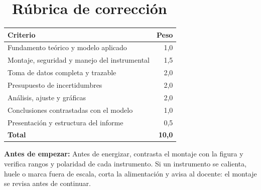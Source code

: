 \documentclass[11pt,a4paper]{article}
\newcommand{\iconotexto}[2]{\textcolor{cyanNeon}{\faIcon{#1}}~#2}
\begin{document}
\section{\iconotexto{ruler-combined}{Rúbrica de corrección}}

\begin{tabularx}{\linewidth}{@{}X r@{}}
\toprule
Criterio & Peso\\
\midrule
Fundamento teórico y modelo aplicado & 1,0 \\
Montaje, seguridad y manejo del instrumental & 1,5 \\
Toma de datos completa y trazable & 2,0 \\
Presupuesto de incertidumbres & 2,0 \\
Análisis, ajuste y gráficas & 2,0 \\
Conclusiones contrastadas con el modelo & 1,0 \\
Presentación y estructura del informe & 0,5 \\
\midrule
\textbf{Total} & \textbf{10,0}\\
\bottomrule
\end{tabularx}

\begin{tcolorbox}[cajaMejora]\textbf{Antes de empezar:} Antes de energizar, contrasta el montaje con la figura y verifica rangos y polaridad de cada instrumento. Si un instrumento se calienta, huele o marca fuera de escala, corta la alimentación y avisa al docente: el montaje se revisa antes de continuar.
\end{tcolorbox}
\end{document}
